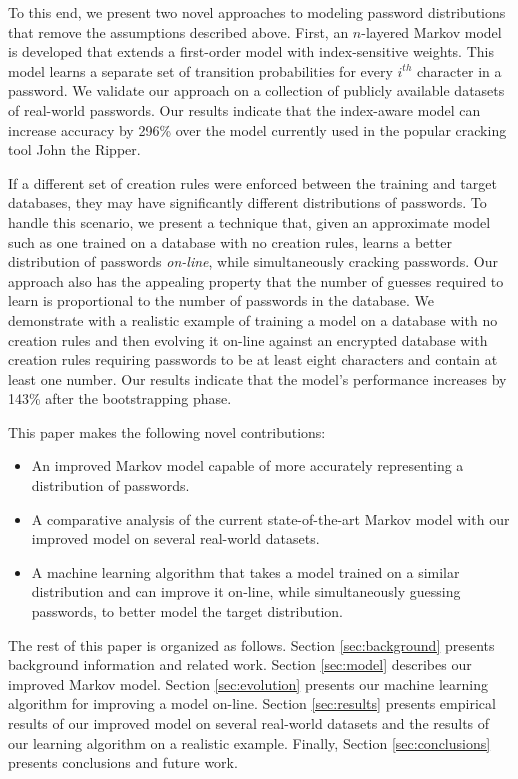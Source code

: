 \documentclass{acm_proc_article-sp}
\begin{document}
To this end, we present two novel approaches to modeling password distributions that remove the assumptions described above. First, an $n$-layered Markov model is developed that extends a first-order model with index-sensitive weights. This model learns a separate set of transition probabilities for every $i^{th}$ character in a password. We validate our approach on a collection of publicly available datasets of real-world passwords. Our results indicate that the index-aware model can increase accuracy by 296\% over the model currently used in the popular cracking tool John the Ripper.

If a different set of creation rules were enforced between the training and target databases, they may have significantly different distributions of passwords. To handle this scenario, we present a technique that, given an approximate model such as one trained on a database with no creation rules, learns a better distribution of passwords \textit{on-line}, while simultaneously cracking passwords. Our approach also has the appealing property that the number of guesses required to learn is  proportional to the number of passwords in the database. We demonstrate with a realistic example of training a model on a database with no creation rules and then evolving it on-line against an encrypted database with creation rules requiring passwords to be at least eight characters and contain at least one number. Our results indicate that the model's performance increases by 143\% after the bootstrapping phase.

This paper makes the following novel contributions:

\begin{itemize}
\item An improved Markov model capable of more accurately representing a distribution of passwords.
\item A comparative analysis of the current state-of-the-art Markov model with our improved model on several real-world datasets.
\item A machine learning algorithm that takes a model trained on a similar distribution and can improve it on-line, while simultaneously guessing passwords, to better model the target distribution. 
\end{itemize}

The rest of this paper is organized as follows. Section \ref{sec:background} presents background information and related work. Section \ref{sec:model} describes our improved Markov model. Section \ref{sec:evolution} presents our machine learning algorithm for improving a model on-line. Section \ref{sec:results} presents empirical results of our improved model on several real-world datasets and the results of our learning algorithm on a realistic example. Finally, Section \ref{sec:conclusions} presents conclusions and future work.
\end{document}
